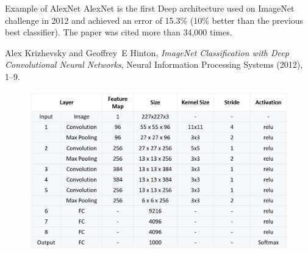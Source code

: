 \documentclass[handout]{beamer}
\begin{document}
\begin{frame}{Example of AlexNet}
    \alert{AlexNet} is the first Deep architecture used on ImageNet challenge in 2012 and achieved an \alert{error of 15.3\%} (10\% better than the previous best classifier). The paper was cited more than 34,000 times.

\begin{thebibliography}{GBC16}

Alex Krizhevsky and Geoffrey~E Hinton, \emph{{ImageNet Classification with Deep
  Convolutional Neural Networks}}, Neural Information Processing Systems
  (2012), 1--9.

\end{thebibliography}
    \begin{figure}
        \centering
        \includegraphics[width=.5\textwidth]{fig/L2/AlexNet_Summary_Table.jpg}

    \end{figure}
\end{frame}
\end{document}
